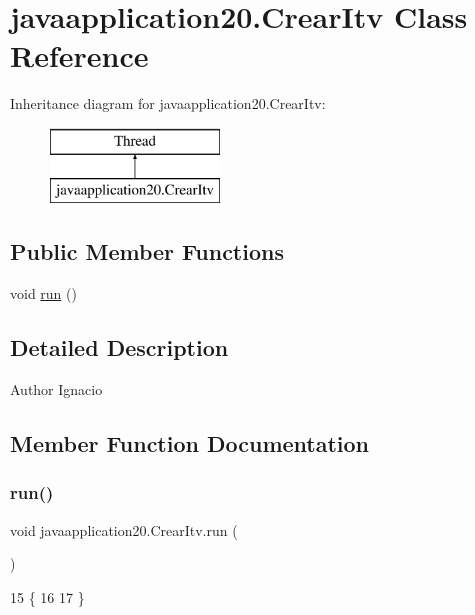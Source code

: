\hypertarget{classjavaapplication20_1_1_crear_itv}{}\section{javaapplication20.\+Crear\+Itv Class Reference}
\label{classjavaapplication20_1_1_crear_itv}
Inheritance diagram for javaapplication20.\+Crear\+Itv\+:\begin{figure}[H]
\begin{center}
\leavevmode
\includegraphics[height=2.000000cm]{classjavaapplication20_1_1_crear_itv}
\end{center}
\end{figure}
\subsection*{Public Member Functions}
\begin{DoxyCompactItemize}
\item 
void \mbox{\hyperlink{classjavaapplication20_1_1_crear_itv_ae5cce50946647910a25ef69e59ffcf96}{run}} ()
\end{DoxyCompactItemize}


\subsection{Detailed Description}
\begin{DoxyAuthor}{Author}
Ignacio 
\end{DoxyAuthor}


\subsection{Member Function Documentation}
\mbox{\label{classjavaapplication20_1_1_crear_itv_ae5cce50946647910a25ef69e59ffcf96}} 
\subsubsection{\texorpdfstring{run()}{run()}}
{\footnotesize\ttfamily void javaapplication20.\+Crear\+Itv.\+run (\begin{DoxyParamCaption}{ }\end{DoxyParamCaption})\hspace{0.3cm}{\ttfamily [inline]}}


\begin{DoxyCode}
15     \{
16         
17     \}
\end{DoxyCode}
